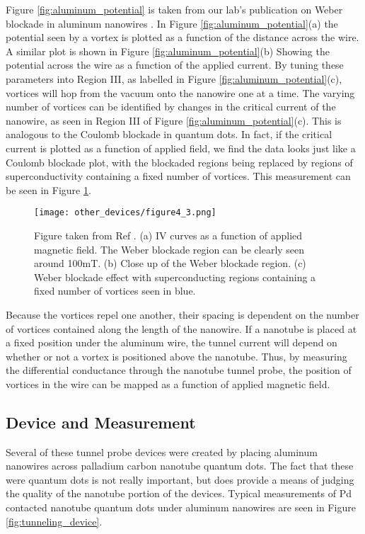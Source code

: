 Figure \ref{fig:aluminum_potential} is taken from our lab's publication on Weber blockade in aluminum nanowires \cite{Morgan-Wall2015}. In Figure \ref{fig:aluminum_potential}(a) the potential seen by a vortex is plotted as a function of the distance across the wire. A similar plot is shown in Figure \ref{fig:aluminum_potential}(b) Showing the potential across the wire as a function of the applied current. By tuning these parameters into Region III, as labelled in Figure \ref{fig:aluminum_potential}(c), vortices will hop from the vacuum onto the nanowire one at a time. The varying number of vortices can be identified by changes in the critical current of the nanowire, as seen in Region III of Figure \ref{fig:aluminum_potential}(c). This is analogous to the Coulomb blockade in quantum dots. In fact, if the critical current is plotted as a function of applied field, we find the data looks just like a Coulomb blockade plot, with the blockaded regions being replaced by regions of superconductivity containing a fixed number of vortices. This measurement can be seen in Figure \ref{fig:weber_measurement}.

\begin{figure}
    \centering
    \texttt{[image: other\_devices/figure4\_3.png]}
    \caption{Figure taken from Ref \cite{Morgan-Wall2015}. (a) IV curves as a function of applied magnetic field. The Weber blockade region can be clearly seen around 100mT. (b) Close up of the Weber blockade region. (c) Weber blockade effect with superconducting regions containing a fixed number of vortices seen in blue.}
    \label{fig:weber_measurement}
\end{figure}

Because the vortices repel one another, their spacing is dependent on the number of vortices contained along the length of the nanowire. If a nanotube is placed at a fixed position under the aluminum wire, the tunnel current will depend on whether or not a vortex is positioned above the nanotube. Thus, by measuring the differential conductance through the nanotube tunnel probe, the position of vortices in the wire can be mapped as a function of applied magnetic field.

\subsection{Device and Measurement}

Several of these tunnel probe devices were created by placing aluminum nanowires across palladium carbon nanotube quantum dots. The fact that these were quantum dots is not really important, but does provide a means of judging the quality of the nanotube portion of the devices. Typical measurements of Pd contacted nanotube quantum dots under aluminum nanowires are seen in Figure \ref{fig:tunneling_device}.

